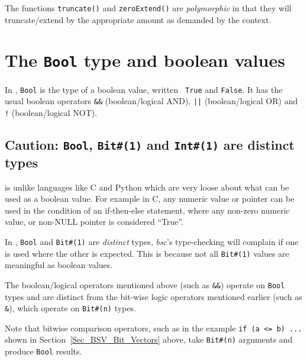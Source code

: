 The functions \verb|truncate()| and \verb|zeroExtend()| are
\emph{polymorphic} in that they will truncate/extend by the
appropriate amount as demanded by the context.


\section{The {\tt Bool} type and boolean values}

\label{Sec_BSV_Boolean_values}


In {\BSV}, \verb|Bool| is the type of a boolean value, written {\tt
True} and {\tt False}. It has the usual boolean operators \verb|&&|
(boolean/logical AND), \verb'||' (boolean/logical OR) and \verb|!|
(boolean/logical NOT).


\subsection{Caution: {\tt Bool}, {\tt Bit\#(1)} and {\tt Int\#(1)} are distinct types}

{\BSV} is unlike languages like C and Python which are very loose
about what can be used as a boolean value.  For example in C, any
numeric value or pointer can be used in the condition of an
if-then-else statement, where any non-zero numeric value, or non-NULL
pointer is considered ``True''.

In {\BSV}, \verb|Bool| and \verb|Bit#(1)| are \emph{distinct} types,
{\ie} \emph{bsc}'s type-checking will complain if one is used where
the other is expected.  This is because not all \verb|Bit#(1)| values
are meaningful as boolean values.

The boolean/logical operators mentioned above (such as \verb|&&|)
operate on \verb|Bool| types and are distinct from the bit-wise logic
operators mentioned earlier (such as \verb|&|), which operate on
\verb|Bit#(n)| types.

Note that bitwise comparison operators, such as in the example
\verb|if (a <= b) ...| shown in Section~\ref{Sec_BSV_Bit_Vectors}
above, take \verb|Bit#(n)| arguments and produce \verb|Bool| results.

